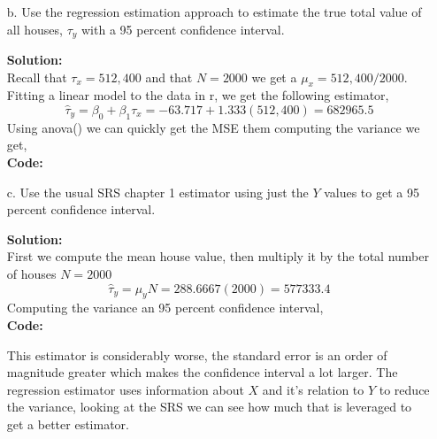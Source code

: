 \documentclass[12pt]{article}
\makeatletter
\theoremstyle{homework}
\newenvironment{exercise}[1]
{\def\@currentlabel{#1}\exercisecore}
{\endexercisecore}
\newcommand{\localhead}[1]{\par\smallskip\noindent\textbf{#1}\nobreak\\}%
\newcommand\solution{\localhead{Solution:}}
\makeatother
\begin{document}
\begin{exercise}{1}
\begin{enumerate}
        \item[b.] Use the regression estimation approach to estimate the true total value of all houses, $\tau_y$ with 
        a 95 percent confidence interval.\\
        \solution  Recall that $\tau_x = 512,400$ and that $N = 2000$ we get a $\mu_x = 512,400/2000$. Fitting a linear 
        model to the data in r, we get the following estimator, 
        \begin{equation*}
            \hat{\tau}_y = \beta_0 + \beta_1\tau_x = -63.717 +1.333(512,400)  = 682965.5
        \end{equation*}
        Using anova() we can quickly get the MSE them computing the variance we get, \\
        \textbf{Code:}
        \begin{center}
           
        \end{center}
        \vspace{.15in}

        \item[c.] Use the usual SRS chapter 1 estimator using just the $Y$ values to get a 95 percent confidence interval.\\
        \solution First we compute the mean house value, then multiply it by the total number of houses $N = 2000$
        \begin{equation*}
            \hat{\tau}_{y} = \mu_yN = 288.6667(2000) =  577333.4
        \end{equation*}  
        Computing the variance an 95 percent confidence interval,\\
        \textbf{Code:}
        \begin{center}
           
        \end{center}
        This estimator is considerably worse, the standard error is an order of magnitude greater which makes the confidence interval 
        a lot larger. The regression estimator uses information about $X$ and it's relation to $Y$ to reduce the variance, looking at the 
        SRS we can see how much that is leveraged to get a better estimator. 
    \end{enumerate}
\end{exercise}
\vspace{1in}
\end{document}
